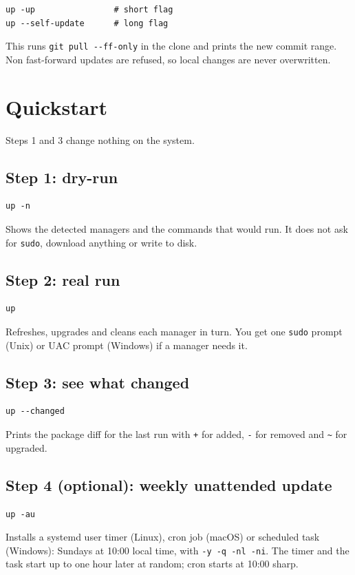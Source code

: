 \documentclass[11pt,a4paper]{article}
\begin{document}
\begin{lstlisting}[language=bashplus]
up -up                # short flag
up --self-update      # long flag
\end{lstlisting}

This runs \texttt{git pull -{}-ff-only} in the clone and prints the new
commit range. Non fast-forward updates are refused, so local changes are
never overwritten.

\section{Quickstart}\label{sec:quickstart}

Steps 1 and 3 change nothing on the system.

\subsection{Step 1: dry-run}
\begin{lstlisting}[language=bashplus]
up -n
\end{lstlisting}
Shows the detected managers and the commands that would run. It does
not ask for \texttt{sudo}, download anything or write to disk.

\subsection{Step 2: real run}
\begin{lstlisting}[language=bashplus]
up
\end{lstlisting}
Refreshes, upgrades and cleans each manager in turn. You get one
\texttt{sudo} prompt (Unix) or UAC prompt (Windows) if a manager needs it.

\subsection{Step 3: see what changed}
\begin{lstlisting}[language=bashplus]
up --changed
\end{lstlisting}
Prints the package diff for the last run with \texttt{+} for added,
\texttt{-} for removed and \texttt{\~} for upgraded.

\subsection{Step 4 (optional): weekly unattended update}
\begin{lstlisting}[language=bashplus]
up -au
\end{lstlisting}
Installs a systemd user timer (Linux), cron job (macOS) or scheduled task
(Windows): Sundays at 10:00 local time, with \texttt{-y -q -nl -ni}.
The timer and the task start up to one hour later at random; cron starts
at 10:00 sharp.
\end{document}
